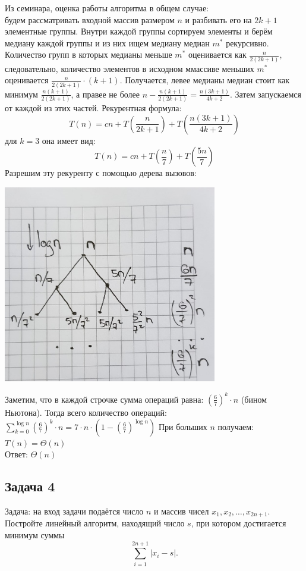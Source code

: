 \documentclass[a4paper,12pt]{article} %
\begin{document}
Из семинара, оценка работы алгоритма в общем случае:\\
будем рассматривать входной массив размером $ n $ и разбивать его на $ 2k+1 $ элементные группы. Внутри каждой группы сортируем элементы и берём медиану каждой группы и из них ищем медиану медиан $ m^* $ рекурсивно. Количество групп в которых медианы меньше $ m^* $ оценивается как $ \frac{n}{2(2k+1)} $, следовательно, количество элементов в исходном ммассиве меньших $ m^* $ оценивается $ \frac{n}{2(2k+1)} \cdot (k+1) $. Получается, левее медианы медиан стоит как минимум $ \frac{n(k+1)}{2(2k+1)} $, а правее не более                $ n - \frac{n(k+1)}{2(2k+1)} = \frac{n(3k+1)}{4k+2} $. Затем запускаемся от каждой из этих частей. Рекурентная формула:
$$
T(n)=c n+T\left(\frac{n}{2 k+1}\right)+T\left(\frac{n(3 k+1)}{4 k+2}\right)
$$
для $ k = 3 $ она имеет вид:
$$
T(n)=c n+T\left(\frac{n}{7}\right)+T\left(\frac{5 n}{7}\right)
$$
Разрешим эту рекуренту с помощью дерева вызовов:
\begin{center}
\includegraphics[width=0.7\textwidth]{tree_3}
\end{center}
Заметим, что в каждой строчке сумма операций равна: $ \left( \frac{6}{7} \right)^k \cdot n $ (бином Ньютона). Тогда всего количество операций: $ \sum\limits_{k=0}^{\log n}\left(\frac{6}{7}\right)^{k} \cdot n=7 \cdot n \cdot\left(1-\left(\frac{6}{7}\right)^{\log n}\right) $
При больших $ n $ получаем: $ T(n) = \Theta(n) $\\
Ответ: $ \Theta(n) $

\subsection*{Задача 4}
Задача: на вход задачи подаётся число $n$ и массив чисел $x_1, x_2, \ldots, x_{2n+1}$. Постройте линейный алгоритм, находящий число $s$, при котором достигается минимум суммы $$ \sum\limits_{i=1}^{2n+1}|x_i - s|. $$
\end{document}
